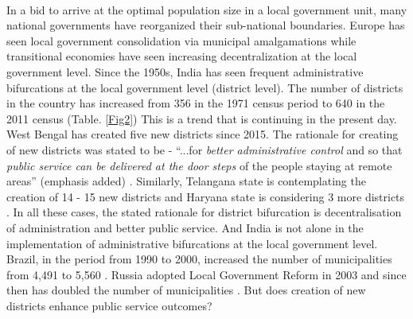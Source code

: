 \documentclass[12pt, a4paper]{article}
\begin{document}
\paragraph{} In a bid to arrive at the optimal population size in a local government unit, many national governments have reorganized their sub-national boundaries. Europe has seen local government consolidation via municipal amalgamations while transitional economies have seen increasing decentralization at the local government level. Since the 1950s, India has seen frequent administrative bifurcations at the local government level (district level). The number of districts in the country has increased from 356 in the 1971 census period to 640 in the 2011 census (Table. \ref{Fig2}) This is a trend that is continuing in the present day. West Bengal has created five new districts since 2015. The rationale for creating of new districts was stated to be - ``...for \textit{better administrative control} and so that \textit{public service can be delivered at the door steps} of the people staying at remote areas'' (emphasis added) \parencite{Mamata}. Similarly, Telangana state is contemplating the creation of 14 - 15 new districts \parencite{Telengana} and Haryana state is considering 3 more districts \parencite{Haryana}. In all these cases, the stated rationale for district bifurcation is decentralisation of administration and better public service. And India is not alone in the implementation of administrative bifurcations at the local government level. Brazil, in the period from 1990 to 2000, increased the number of municipalities from 4,491 to 5,560 \parencite{tomio2005creation}. Russia adopted Local Government Reform in 2003 and since then has doubled the number of municipalities \parencite{turgel2008new}\nocite{avellaneda_is_2015}. But does creation of new districts enhance public service outcomes?
\end{document}
